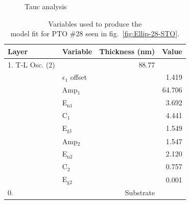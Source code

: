 \begin{figure}[htbp]
   \label{fig:Tauc-20-Pt}
   \centering
   \hspace{0.5cm}
   \caption[Results of Tauc Analysis on Sample \#20 on Platinized Silicon]%
   		{Tauc analysis}
\end{figure}

\begin{table}[htbp]
	\centering
	\caption[PTO \#28 Ellipsometric Model Variables]{Variables used to produce the\\model fit for PTO \#28 seen in fig.~\vref{fig:Ellip-28-STO}. \label{tbl:PTO-28-ellip-variables}}
	\begin{tabular}{l l r r}
	\toprule
	Layer&Variable&Thickness (nm)&Value\\
	\midrule
	1. T-L Osc. (2)&&88.77&\\
	&$\epsilon_{1}$ offset&&1.419\\
	&Amp$_{1}$&&64.706\\
	&E$_{\mathrm{n 1}}$&&3.692\\
	&C$_{1}$&&4.441\\
	&E$_{\mathrm{g1}}$&&1.549\\
	&Amp$_{2}$&&1.547\\
	&E$_{\mathrm{n 2}}$&&2.120\\
	&C$_{2}$&&0.757\\
	&E$_{\mathrm{g2}}$&&0.001\\
	0. \ce{STO}&&Substrate&\\
	\bottomrule
	\end{tabular}
\end{table}

